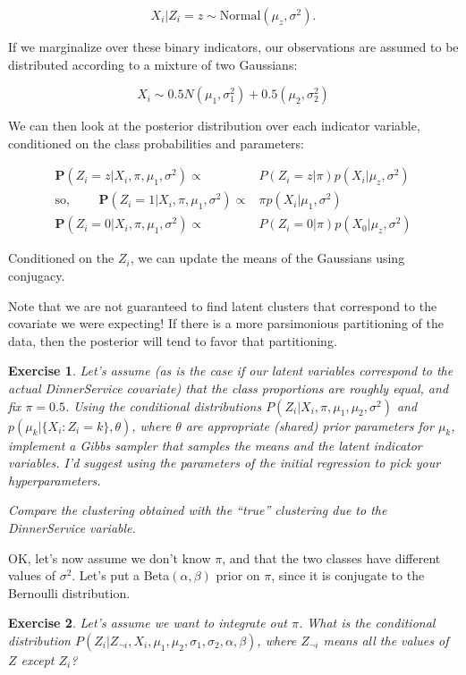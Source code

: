 \documentclass[twoside]{article}
\newcounter{lecnum}
\newtheorem{exercise}{Exercise}[lecnum]
\newcommand\Prob{\mathbf{P}}
\begin{document}
$$X_i|Z_i=z \sim \mbox{Normal}(\mu_{z}, \sigma^2).$$

If we marginalize over these binary indicators, our observations are assumed to be distributed according to a mixture of two Gaussians:

$$X_i \sim 0.5N(\mu_1,\sigma_1^2) + 0.5(\mu_2,\sigma_2^2)$$

We can then look at the posterior distribution over each indicator variable, conditioned on the class probabilities and parameters:

$$\begin{aligned}\Prob(Z_i = z|X_i, \pi, \mu_1,\sigma^2) \propto& P(Z_i=z|\pi)p(X_i|\mu_z,\sigma^2)\\
  \mbox{so, }\qquad \Prob(Z_i=1|X_i, \pi, \mu_1,\sigma^2) \propto& \pi p(X_i|\mu_1,\sigma^2)\\
  \Prob(Z_i=0|X_i, \pi, \mu_1,\sigma^2) \propto& P(Z_i=0|\pi)p(X_0|\mu_z,\sigma^2)
\end{aligned}$$

Conditioned on the $Z_i$, we can update the means of the Gaussians using conjugacy.

Note that we are not guaranteed to find latent clusters that correspond to the covariate we were expecting! If there is a more parsimonious partitioning of the data, then the posterior will tend to favor that partitioning.

\begin{exercise}
  Let's assume (as is the case if our latent variables correspond to the actual DinnerService covariate) that the class proportions are roughly equal, and fix $\pi=0.5$. Using the conditional distributions $P(Z_i|X_i,\pi,\mu_1,\mu_2,\sigma^2)$ and $p(\mu_k|\{X_i:Z_i=k\}, \theta)$, where $\theta$ are appropriate (shared) prior parameters for $\mu_k$, implement a Gibbs sampler that samples the means and the latent indicator variables. I'd suggest using the parameters of the initial regression to pick your hyperparameters.

  Compare the clustering obtained with the ``true'' clustering due to the DinnerService variable.
\end{exercise}


OK, let's now assume we don't know $\pi$, and that the two classes have different values of $\sigma^2$. Let's put a Beta$(\alpha,\beta)$ prior on $\pi$, since it is conjugate to the Bernoulli distribution. 

\begin{exercise}
  Let's assume we want to integrate out $\pi$. What is the conditional distribution $P(Z_i|Z_{\neg i}, X_i,\mu_1,\mu_2,\sigma_1,\sigma_2,\alpha,\beta)$, where $Z_{\neg i}$ means all the values of $Z$ except $Z_i$?
\end{exercise}
\end{document}
